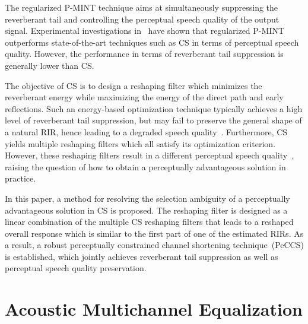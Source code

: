 \documentclass{article}
\begin{document}
The regularized P-MINT technique aims at simultaneously suppressing the reverberant tail and controlling the perceptual speech quality of the output signal.
Experimental investigations in~\cite{Kodrasi_IWAENC_2012} have shown that regularized P-MINT outperforms state-of-the-art techniques such as CS in terms of perceptual speech quality.
However, the performance in terms of reverberant tail suppression is generally lower than CS.

The objective of CS is to design a reshaping filter which minimizes the reverberant energy while maximizing the energy of the direct path and early reflections.
Such an energy-based optimization technique typically achieves a high level of reverberant tail suppression, but may fail to preserve the general shape of a natural RIR, hence leading to a degraded speech quality~\cite{Kodrasi_IWAENC_2012}.
Furthermore, CS yields multiple reshaping filters which all satisfy its optimization criterion.
However, these reshaping filters result in a different perceptual speech quality~\cite{Zhang_IWAENC_2010}, raising the question of how to obtain a perceptually advantageous solution in practice.

In this paper, a method for resolving the selection ambiguity of a perceptually advantageous solution in CS is proposed.
The reshaping filter is designed as a linear combination of the multiple CS reshaping filters that leads to a reshaped overall response which is similar to the first part of one of the estimated RIRs. 
As a result, a robust perceptually constrained channel shortening technique~(PeCCS) is established, which jointly achieves reverberant tail suppression as well as perceptual speech quality preservation.

\section{Acoustic Multichannel Equalization}
\label{sec: ame}
\end{document}
